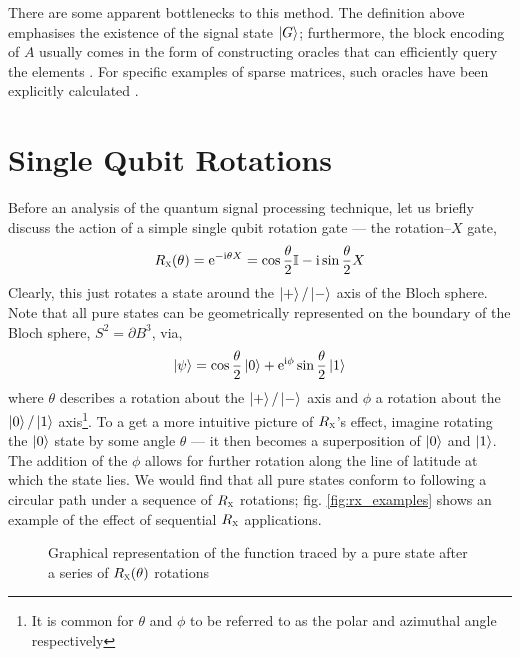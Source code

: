 \documentclass{article}
\begin{document}
There are some apparent bottlenecks to this method. The definition above emphasises the existence of the signal state $\ket{G}$; furthermore, the block encoding of $A$ usually comes in the form of constructing oracles that can efficiently query the elements \cite{BCK15,CKS17}. For specific examples of sparse matrices, such oracles have been explicitly calculated \cite{CLBY23}. 

\clearpage
\section{Single Qubit Rotations}
Before an analysis of the quantum signal processing technique, let us briefly discuss the action of a simple single qubit rotation gate --- the rotation--$X$ gate,
\begin{equation}\label{eq:rotX}
    R_{\textsc{x}}(\theta) = \mathrm{e}^{-\mathrm{i} \theta X} = \cos\frac{\theta}{2}\mathbb{I} - \mathrm{i}\sin\frac{\theta}{2}X
\end{equation}
Clearly, this just rotates a state around the $\ket{+}/\ket{-}$ axis of the Bloch sphere. Note that all pure states can be geometrically represented on the boundary of the Bloch sphere, $S^2 = \partial B^3$, via,
\begin{equation}
    \ket{\psi} = \cos\frac{\theta}{2}\ket{0} + \mathrm{e}^{\mathrm{i} \phi}\sin\frac{\theta}{2}\ket{1}
\end{equation}
where $\theta$ describes a rotation about the $\ket{+}/\ket{-}$ axis and $\phi$ a rotation about the $\ket{0}/\ket{1}$ axis\footnote{It is common for $\theta$ and $\phi$ to be referred to as the polar and azimuthal angle respectively}. To a get a more intuitive picture of $R_{\textsc{x}}$'s effect, imagine rotating the $\ket{0}$ state by some angle $\theta$ --- it then becomes a superposition of $\ket{0}$ and $\ket{1}$. The addition of the $\phi$ allows for further rotation along the line of latitude at which the state lies. We would find that all pure states conform to following a circular path under a sequence of $R_{\textsc{x}}$ rotations; fig. \ref{fig:rx_examples} shows an example of the effect of sequential $R_{\textsc{x}}$ applications. 

\begin{figure}[!ht]
    \centering
    \caption{Graphical representation of the function traced by a pure state after a series of $R_{\textsc{x}}(\theta)$ rotations}
    \label{fig:cos}
\end{figure}
\end{document}
